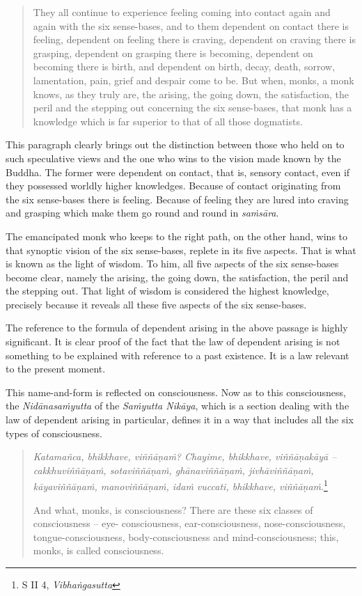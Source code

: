 \begin{quote}
They all continue to experience feeling coming into contact again and again with the six sense-bases, and to them dependent on contact there is feeling, dependent on feeling there is craving, dependent on craving there is grasping, dependent on grasping there is becoming, dependent on becoming there is birth, and dependent on birth, decay, death, sorrow, lamentation, pain, grief and despair come to be. But when, monks, a monk knows, as they truly are, the arising, the going down, the satisfaction, the peril and the stepping out concerning the six sense-bases, that monk has a knowledge which is far superior to that of all those dogmatists.
\end{quote}

This paragraph clearly brings out the distinction between those who held on to such speculative views and the one who wins to the vision made known by the Buddha. The former were dependent on contact, that is, sensory contact, even if they possessed worldly higher knowledges. Because of contact originating from the six sense-bases there is feeling. Because of feeling they are lured into craving and grasping which make them go round and round in \emph{saṁsāra}.

The emancipated monk who keeps to the right path, on the other hand, wins to that synoptic vision of the six sense-bases, replete in its five aspects. That is what is known as the light of wisdom. To him, all five aspects of the six sense-bases become clear, namely the arising, the going down, the satisfaction, the peril and the stepping out. That light of wisdom is considered the highest knowledge, precisely because it reveals all these five aspects of the six sense-bases.

The reference to the formula of dependent arising in the above passage is highly significant. It is clear proof of the fact that the law of dependent arising is not something to be explained with reference to a past existence. It is a law relevant to the present moment.

This name-and-form is reflected on consciousness. Now as to this consciousness, the \emph{Nidānasaṁyutta} of the \emph{Saṁyutta Nikāya}, which is a section dealing with the law of dependent arising in particular, defines it in a way that includes all the six types of consciousness.

\begin{quote}
\emph{Katamañca, bhikkhave, viññāṇaṁ? Chayime, bhikkhave, viññāṇakāyā -- cakkhuviññāṇaṁ, sotaviññāṇaṁ, ghānaviññāṇaṁ, jivhāviññāṇaṁ, kāyaviññāṇaṁ, manoviññāṇaṁ, idaṁ vuccati, bhikkhave, viññāṇaṁ}.\footnote{S II 4, \emph{Vibhaṅgasutta}}

And what, monks, is consciousness? There are these six classes of consciousness -- eye- consciousness, ear-consciousness, nose-consciousness, tongue-consciousness, body-consciousness and mind-consciousness; this, monks, is called consciousness.
\end{quote}

